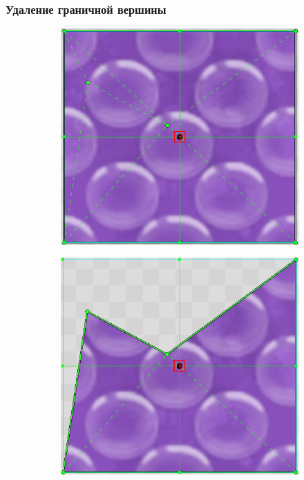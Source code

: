 \documentclass[10pt, unicode]{beamer}
\begin{document}
    \begin{frame}
        \frametitle{Удаление граничной вершины}
        \begin{figure}[H]
            \centering
            \begin{subfigure}{0.33\linewidth}
                \centering
                \includegraphics[scale=0.225]{DeleteBoundary1.png}
            \end{subfigure}
            \begin{subfigure}[H]{0.33\linewidth}
                \centering
                \includegraphics[scale=0.225]{DeleteBoundary2.png}

\end{subfigure}
\end{figure}
\end{frame}
\end{document}
